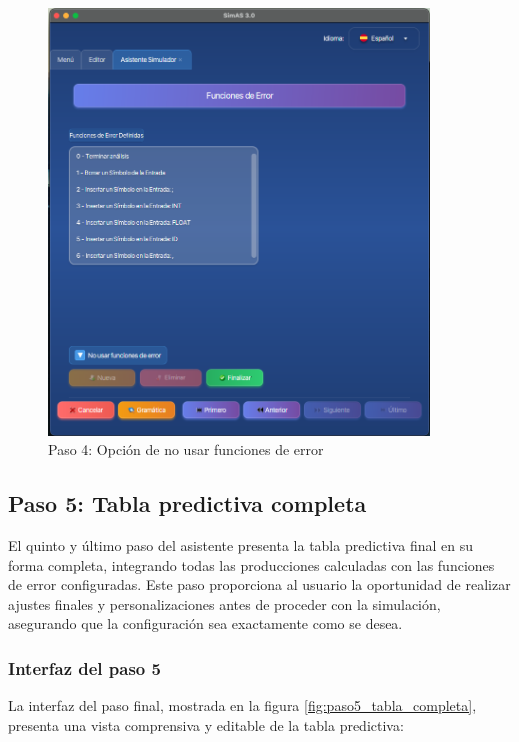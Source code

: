 \needspace{8cm}
\begin{figure}[H]
    \centering
    \includegraphics[width=0.9\textwidth]{figuras/simulador/paso4_no_usar_funError.png}
    \caption{Paso 4: Opción de no usar funciones de error}
    \label{fig:paso4_sin_funciones_error}
\end{figure}

\subsection{Paso 5: Tabla predictiva completa}

El quinto y último paso del asistente presenta la tabla predictiva final en su forma completa, integrando todas las producciones calculadas con las funciones de error configuradas. Este paso proporciona al usuario la oportunidad de realizar ajustes finales y personalizaciones antes de proceder con la simulación, asegurando que la configuración sea exactamente como se desea.

\subsubsection{Interfaz del paso 5}

La interfaz del paso final, mostrada en la figura \ref{fig:paso5_tabla_completa}, presenta una vista comprensiva y editable de la tabla predictiva:

